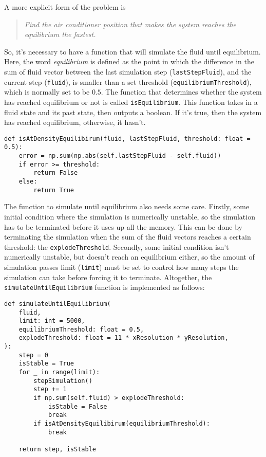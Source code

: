 A more explicit form of the problem is
\begin{quote}
	\emph{Find the air conditioner position that makes the system reaches the equilibrium the fastest.}
\end{quote}
So, it's necessary to have a function that will simulate the fluid until equilibrium. Here, the word \emph{equilibrium} is defined as the point in which the difference in the sum of fluid vector between the last simulation step (\texttt{lastStepFluid}), and the current step (\texttt{fluid}), is smaller than a set threshold (\texttt{equilibriumThreshold}), which is normally set to be $0.5$. The function that determines whether the system has reached equilibrium or not is called \texttt{isEquilibrium}. This function takes in a fluid state and its past state, then outputs a boolean. If it's true, then the system has reached equilibrium, otherwise, it hasn't.
\begin{verbatim}
def isAtDensityEquilibirum(fluid, lastStepFluid, threshold: float = 0.5):
    error = np.sum(np.abs(self.lastStepFluid - self.fluid))
    if error >= threshold:
        return False
    else:
        return True
\end{verbatim}

The function to simulate until equilibrium also needs some care. Firstly, some initial condition where the simulation is numerically unstable, so the simulation has to be terminated before it uses up all the memory. This can be done by terminating the simulation when the sum of the fluid vectors reaches a certain threshold: the \texttt{explodeThreshold}. Secondly, some initial condition isn't numerically unstable, but doesn't reach an equilibrium either, so the amount of simulation passes limit (\texttt{limit}) must be set to control how many steps the simulation can take before forcing it to terminate. Altogether, the \texttt{simulateUntilEquilibrium} function is implemented as follows:
\begin{verbatim}
def simulateUntilEquilibrium(
    fluid,
    limit: int = 5000,
    equilibriumThreshold: float = 0.5,
    explodeThreshold: float = 11 * xResolution * yResolution,
):
    step = 0
    isStable = True
    for _ in range(limit):
        stepSimulation()
        step += 1
        if np.sum(self.fluid) > explodeThreshold:
            isStable = False
            break
        if isAtDensityEquilibirum(equilibriumThreshold):
            break
    
    return step, isStable
\end{verbatim}

